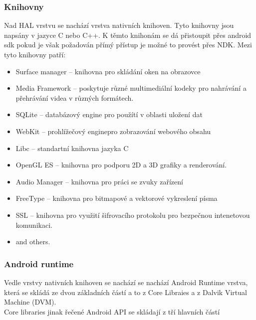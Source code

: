 \subsubsection{Knihovny}
Nad HAL vrstvu se nachází vrstva nativních knihoven. Tyto knihovny jsou napsány v jazyce C nebo C++. K těmto knihonám se dá přistoupit přes android sdk pokud je však požadován přímý přístup je možné to provést přes NDK. Mezi tyto knihovny patří:
\begin{itemize} %
\item Surface manager -- knihovna pro skládání oken na obrazovce
\item Media Framework -- poskytuje různé multimediální kodeky pro nahrávání a přehrávání videa v různých formátech.
\item SQLite -- databázový engine pro použítí v oblasti uložení dat
\item WebKit -- prohlížečový enginepro  zobrazování webového obsahu
\item Libc -- standartní knihovna jazyka C 
\item OpenGL ES -- knihovna pro podporu 2D a 3D grafiky a renderování.
\item Audio Manager -- knihovna pro práci se zvuky zařízení
\item FreeType -- knihovna pro bitmapové a vektorové vykreslení písma
\item SSL -- knihovna pro využití šifrovacího protokolu pro bezpečnou intenetovou komunikaci.
\item and others.
\end{itemize}


\subsubsection{Android runtime}
Vedle vrstvy nativních knihoven se nachází se nachází Android Runtime vrstva, která se skládá ze dvou základních částí a to z Core Libraies a z Dalvik Virtual Machine (DVM). \\
Core libraries jinak řečené Android API se skládají z tří hlavních částí



